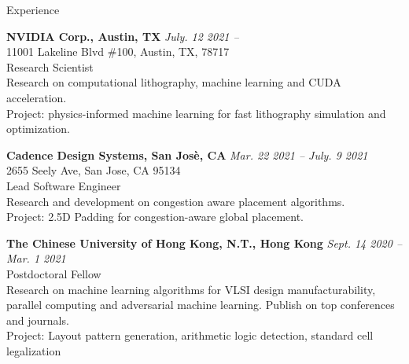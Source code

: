 
\begin{rSection}{Experience}

{\bf NVIDIA Corp., Austin, TX}         \hfill {\em July. 12 2021 -- } \\
11001 Lakeline Blvd \#100, Austin, TX, 78717 \\
Research Scientist \\
Research on computational lithography, machine learning and CUDA acceleration. \\
Project: physics-informed machine learning for fast lithography simulation and optimization.	
	
{\bf Cadence Design Systems, San Jos\`{e}, CA}         \hfill {\em Mar. 22 2021 -- July. 9 2021 } \\
2655 Seely Ave, San Jose, CA 95134 \\
Lead Software Engineer \\
Research and development on congestion aware placement algorithms. \\
Project: 2.5D Padding for congestion-aware global placement.
	
{\bf The Chinese University of Hong Kong, N.T., Hong Kong}         \hfill {\em Sept. 14 2020 -- Mar. 1 2021} \\
Postdoctoral Fellow \\
Research on machine learning algorithms for VLSI design manufacturability, parallel computing and adversarial machine learning. Publish on top conferences and journals. \\
Project: Layout pattern generation, arithmetic logic detection, standard cell legalization 


	



\end{rSection}


